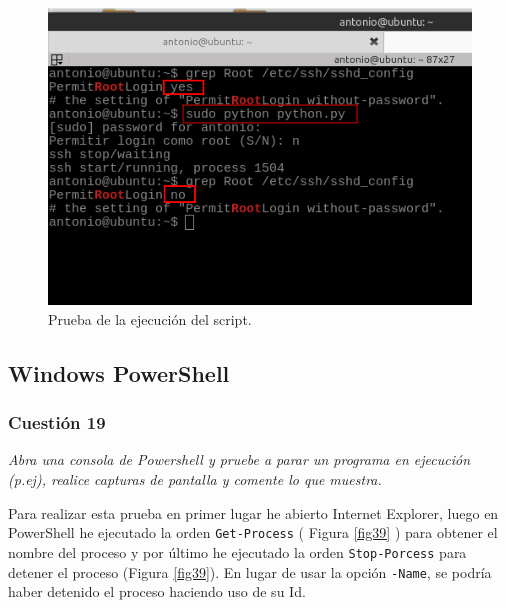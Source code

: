 \begin{figure}[H]
    \begin{center}
    \advance\leftskip-1cm
        \includegraphics[scale=0.5]{imagenes/img55}
        \caption{Prueba de la ejecución del script.}
        \label{fig50}
    \end{center}
\end{figure}


\subsection{Windows PowerShell}
\subsubsection{Cuestión 19}
\textit{Abra una consola de Powershell y pruebe a parar un programa en ejecución (p.ej), realice capturas de pantalla y comente lo que muestra.}
\newline

Para realizar esta prueba en primer lugar he abierto Internet Explorer, luego en PowerShell he ejecutado la orden \texttt{Get-Process} \cite{gpps} ( Figura \ref{fig39} ) para obtener el nombre del proceso y por último he ejecutado la orden \texttt{Stop-Porcess} \cite{spps} para detener el proceso (Figura \ref{fig39}). En lugar de usar la opción \texttt{-Name}, se podría haber detenido el proceso haciendo uso de su Id. 

